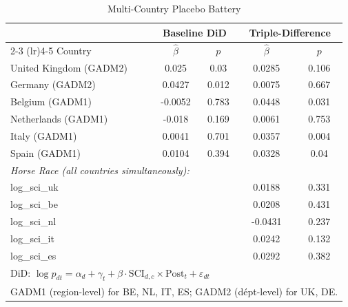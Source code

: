 \begin{table}[htbp]
\centering
\caption{Multi-Country Placebo Battery}
\label{tab:placebo}
\begin{tabular}{lcccc}
\hline\hline
 & \multicolumn{2}{c}{Baseline DiD} & \multicolumn{2}{c}{Triple-Difference} \\
\cmidrule(lr){2-3} \cmidrule(lr){4-5}
Country & $\hat{\beta}$ & $p$ & $\hat{\beta}$ & $p$ \\
\hline
United Kingdom (GADM2) & 0.025 & 0.03 & 0.0285 & 0.106 \\
Germany (GADM2) & 0.0427 & 0.012 & 0.0075 & 0.667 \\
Belgium (GADM1) & -0.0052 & 0.783 & 0.0448 & 0.031 \\
Netherlands (GADM1) & -0.018 & 0.169 & 0.0061 & 0.753 \\
Italy (GADM1) & 0.0041 & 0.701 & 0.0357 & 0.004 \\
Spain (GADM1) & 0.0104 & 0.394 & 0.0328 & 0.04 \\
\hline
\multicolumn{5}{l}{\textit{Horse Race (all countries simultaneously):}} \\
\quad log\_sci\_uk & & & 0.0188 & 0.331 \\
\quad log\_sci\_be & & & 0.0208 & 0.431 \\
\quad log\_sci\_nl & & & -0.0431 & 0.237 \\
\quad log\_sci\_it & & & 0.0242 & 0.132 \\
\quad log\_sci\_es & & & 0.0292 & 0.382 \\
\hline
\multicolumn{5}{l}{\footnotesize DiD: $\log p_{dt} = \alpha_d + \gamma_t + \beta \cdot \text{SCI}_{d,c} \times \text{Post}_t + \varepsilon_{dt}$} \\
\multicolumn{5}{l}{\footnotesize GADM1 (region-level) for BE, NL, IT, ES; GADM2 (d\'ept-level) for UK, DE.} \\
\hline\hline
\end{tabular}
\end{table}
